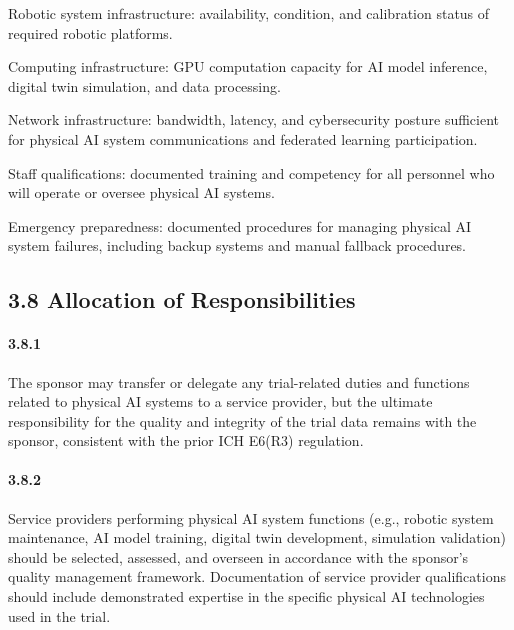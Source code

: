 \begin{description}[leftmargin=2.5cm,style=sameline]

\item[(a)] Robotic system infrastructure: availability, condition, and calibration status of required robotic platforms.

\item[(b)] Computing infrastructure: GPU computation capacity for AI model inference, digital twin simulation, and data processing.

\item[(c)] Network infrastructure: bandwidth, latency, and cybersecurity posture sufficient for physical AI system communications and federated learning participation.

\item[(d)] Staff qualifications: documented training and competency for all personnel who will operate or oversee physical AI systems.

\item[(e)] Emergency preparedness: documented procedures for managing physical AI system failures, including backup systems and manual fallback procedures.

\end{description}

\subsection{3.8 Allocation of Responsibilities}

\paragraph{3.8.1} The sponsor may transfer or delegate any trial-related duties and functions related to physical AI systems to a service provider, but the ultimate responsibility for the quality and integrity of the trial data remains with the sponsor, consistent with the prior ICH E6(R3) regulation.

\paragraph{3.8.2} Service providers performing physical AI system functions (e.g., robotic system maintenance, AI model training, digital twin development, simulation validation) should be selected, assessed, and overseen in accordance with the sponsor's quality management framework. Documentation of service provider qualifications should include demonstrated expertise in the specific physical AI technologies used in the trial.

